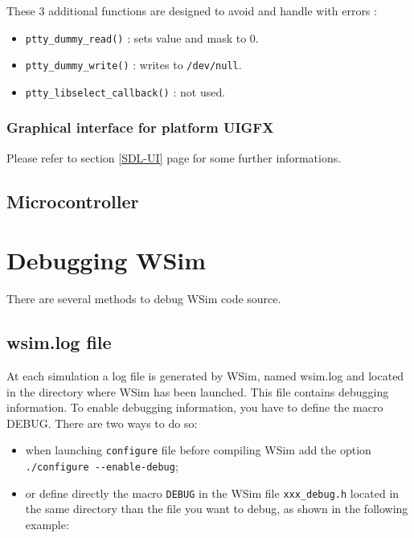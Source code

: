 \documentclass[a4paper,10pt]{report}
\begin{document}
These 3 additional functions are designed to avoid and handle with errors :
\begin{itemize}
  \item \verb$ptty_dummy_read()$ : sets value and mask to 0.
  \item \verb$ptty_dummy_write()$ : writes to \verb$/dev/null$.
  \item \verb$ptty_libselect_callback()$ : not used.
\end{itemize}

\subsection{Graphical interface for platform UIGFX}
Please refer to section \ref{SDL-UI} page \pageref{SDL-UI} for some further informations.


\section{Microcontroller}


\chapter{Debugging WSim}

There are several methods to debug WSim code source.

\section{wsim.log file}

At each simulation a log file is generated by WSim, named wsim.log and located in the directory where WSim has been launched. This file contains debugging information.
To enable debugging information, you have to define the macro DEBUG. There are two ways to do so:

\begin{itemize}
  \item when launching \verb$configure$ file before compiling WSim add the option \verb$./configure --enable-debug$;
  \item or define directly the macro \verb$DEBUG$ in the WSim file \verb$xxx_debug.h$ located in the same directory than the file you want to debug, as shown in the following example:
\end{itemize}
\end{document}
